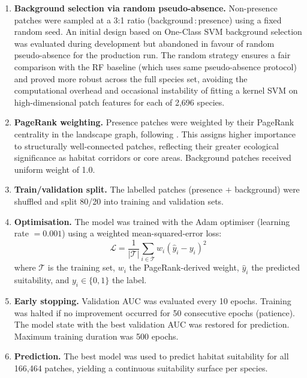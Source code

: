 \begin{enumerate}
    \item \textbf{Background selection via random pseudo-absence.}
    Non-presence patches were sampled at a 3:1 ratio (background\,:\,presence) 
    using a fixed random seed. An initial design based on One-Class SVM background 
    selection \citep[as in][]{Wu2025} was evaluated during development but 
    abandoned in favour of random pseudo-absence for the production run. The 
    random strategy ensures a fair comparison with the RF baseline (which uses 
    same pseudo-absence protocol) and proved more robust across the full species 
    set, avoiding the computational overhead and occasional instability of 
    fitting a kernel SVM on high-dimensional patch features for
    each of 2,696 species.

    \item \textbf{PageRank weighting.}
    Presence patches were weighted by their PageRank centrality in the landscape 
    graph, following \citet{Wu2025}. This assigns higher importance to 
    structurally well-connected patches, reflecting their greater ecological 
    significance as habitat corridors or core areas. Background patches received 
    uniform weight of 1.0.

    \item \textbf{Train/validation split.}
    The labelled patches (presence $+$ background) were shuffled and split 80/20 
    into training and validation sets.

    \item \textbf{Optimisation.}
    The model was trained with the Adam optimiser (learning rate $= 0.001$) 
    using a weighted mean-squared-error loss:
    \[
        \mathcal{L} = \frac{1}{|\mathcal{T}|} \sum_{i \in \mathcal{T}} w_i \left( \hat{y}_i - y_i \right)^2
    \]
    where $\mathcal{T}$ is the training set, $w_i$ the PageRank-derived weight, 
    $\hat{y}_i$ the predicted suitability, and $y_i \in \{0, 1\}$ the label.

    \item \textbf{Early stopping.}
    Validation AUC was evaluated every 10 epochs. Training was halted if no 
    improvement occurred for 50 consecutive epochs (patience). The model state 
    with the best validation AUC was restored for prediction. Maximum training 
    duration was 500 epochs.

    \item \textbf{Prediction.}
    The best model was used to predict habitat suitability for all 166,464 
    patches, yielding a continuous suitability surface per species.
\end{enumerate}

